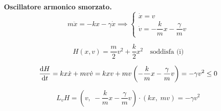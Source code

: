 \begin{example}
    \textbf{Oscillatore armonico smorzato.}\\
    \begin{equation}
        m\ddot{x} = -kx - \gamma \dot{x}
        \implies 
        \begin{cases}
            \dot{x} = v \\
            \dot{v} = -\dfrac{k}{m}x - \dfrac{\gamma}{m} v
        \end{cases}
    \end{equation}

    \begin{equation}
        H(x,v) = \frac{m}{2}v^2 + \frac{k}{2}x^2 \quad \text{soddisfa (i)}
    \end{equation}

    \begin{equation}
        \dv{H}{t} = kx\dot{x} + mv\dot{v} 
        = kxv + mv\left(-\frac{k}{m}x - \frac{\gamma}{m} v \right) 
        = - \gamma v^2 \leq 0
    \end{equation}
\begin{remark}
    \begin{equation*}
         L_v H = 
        \left(v,\; -\frac{k}{m}x - \frac{\gamma}{m} v \right) 
        \cdot \left(kx,\; mv \right) 
        = - \gamma v^2
    \end{equation*}
\end{remark}

\end{example}


